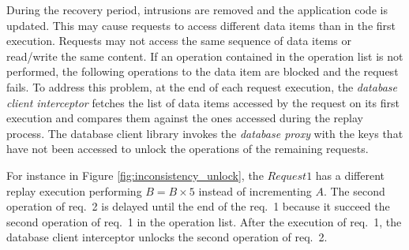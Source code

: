 During the recovery period, intrusions are removed and the application code is updated. This may cause requests to access different data items than in the first execution. Requests may not access the same sequence of data items or read/write the same content. If an operation contained in the operation list is not performed, the following operations to the data item are blocked and the request fails. To address this problem, at the end of each request execution, the \textit{database client interceptor} fetches the list of data items accessed by the request on its first execution and compares them against the ones accessed during the replay process. The database client library invokes the \emph{database proxy} with the keys that have not been accessed to unlock the operations of the remaining requests. 

For instance in Figure \ref{fig:inconsistency_unlock}, the $Request 1$ has a different replay execution performing $B = B \times 5$ instead of incrementing $A$. The second operation of {req.~2} is delayed until the end of the {req.~1} because it succeed the second operation of {req.~1} in the operation list. After the execution of {req.~1}, the database client interceptor unlocks the second operation of {req.~2}.\\

